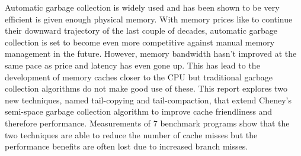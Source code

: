 Automatic garbage collection is widely used and has been shown to be very
efficient is given enough physical memory. With memory prices like to continue
their downward trajectory of the last couple of decades, automatic garbage
collection is set to become even more competitive against manual memory management
in the future. However, memory bandwidth hasn't improved at the same pace as price
and latency has even gone up. This has lead to the development of memory caches
closer to the CPU but traditional garbage collection algorithms do not make good
use of these. This report explores two new techniques, named tail-copying and
tail-compaction, that extend Cheney's
semi-space garbage collection algorithm to improve cache friendliness and therefore
performance. Measurements of 7 benchmark programs show that the two techniques
are able to reduce the number of cache misses but the performance benefits are
often lost due to increased branch misses.
